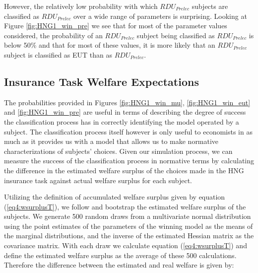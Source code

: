 \documentclass[../main.tex]{subfiles}
\begin{document}
However, the relatively low probability with which $\mathit{RDU_{Prelec}}$ subjects are classified as $\mathit{RDU_{Prelec}}$ over a wide range of parameters is surprising.
Looking at Figure \ref{fig:HNG1_win_pre} we see that for most of the parameter values considered, the probability of an $\mathit{RDU_{Prelec}}$ subject being classified as $\mathit{RDU_{Prelec}}$ is below 50\% and that for most of these values, it is more likely that an $\mathit{RDU_{Prelec}}$ subject is classified as EUT than as $\mathit{RDU_{Prelec}}$.




\subsection{\texorpdfstring{\textcite{Harrison2016}}{Harrison and Ng (2016)} Insurance Task Welfare Expectations}
\label{sec4:WT}

The probabilities provided in Figures \ref{fig:HNG1_win_mu}, \ref{fig:HNG1_win_eut} and \ref{fig:HNG1_win_pre} are useful in terms of describing the degree of success the classification process has in correctly identifying the model operated by a subject.
The classification process itself however is only useful to economists in as much as it provides us with a model that allows us to make normative characterizations of subjects' choices.
Given our simulation process, we can measure the success of the classification process in normative terms by calculating the difference in the estimated welfare surplus of the choices made in the HNG insurance task against actual welfare surplus for each subject.

Utilizing the definition of accumulated welfare surplus given by equation (\ref{eq4:wsurplusT}), we follow \textcite[110-111]{Harrison2016} and bootstrap the estimated welfare surplus of the subjects.
We generate 500 random draws from a multivariate normal distribution using the point estimates of the parameters of the winning model as the means of the marginal distributions, and the inverse of the estimated Hessian matrix as the covariance matrix.{\footnotemark}
With each draw we calculate equation (\ref{eq4:wsurplusT}) and define the estimated welfare surplus as the average of these 500 calculations.
Therefore the difference between the estimated and real welfare is given by:

\addtocounter{footnote}{-1}
\end{document}
